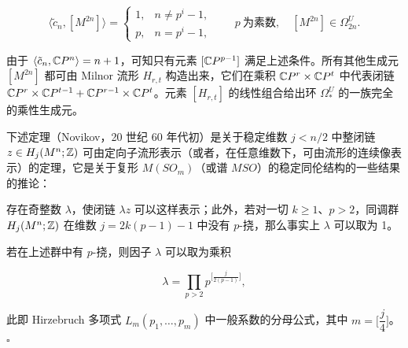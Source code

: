 \[ \langle\tilde c_n,[M^{2n}]\rangle=\begin{cases}1, & n\ne p^i-1,\\ p, & n=p^i-1,\end{cases}\qquad p\ \text{为素数},\quad [M^{2n}]\in\Omega^U_{2n}. \]

由于 $\langle\tilde c_n,\mathbb{C}P^n\rangle=n+1$，可知只有元素 $[\mathbb{C}P^{p-1}]$ 满足上述条件。所有其他生成元 $[M^{2n}]$ 都可由 Milnor 流形 $H_{r,t}$ 构造出来，它们在乘积 $\mathbb{C}P^r\times\mathbb{C}P^t$ 中代表闭链 $\mathbb{C}P^r\times\mathbb{C}P^{t-1}+\mathbb{C}P^{r-1}\times\mathbb{C}P^t$。元素 $[H_{r,t}]$ 的线性组合给出环 $\Omega_*^{U}$ 的一族完全的乘性生成元。

下述定理（Novikov，20 世纪 60 年代初）是关于稳定维数 $j<n/2$ 中整闭链 $z\in H_j(M^n;\mathbb{Z})$ 可由定向子流形表示（或者，在任意维数下，可由流形的连续像表示）的定理，它是关于复形 $M(SO_m)$（或谱 $MSO$）的稳定同伦结构的一些结果的推论：

\begin{theorem*}{}
存在奇整数 $\lambda$，使闭链 $\lambda z$ 可以这样表示；此外，若对一切 $k\ge 1$、$p>2$，同调群 $H_j(M^n;\mathbb{Z})$ 在维数 $j=2k(p-1)-1$ 中没有 $p$-挠，那么事实上 $\lambda$ 可以取为 1。
\end{theorem*}

\begin{remark}{}
若在上述群中有 $p$-挠，则因子 $\lambda$ 可以取为乘积

\[ \lambda=\prod_{p>2}p^{\bigl[\frac{j}{2(p-1)}\bigr]}, \]

此即 Hirzebruch 多项式 $L_m(p_1,\dots,p_m)$ 中一般系数的分母公式，其中 $m=\bigl[\dfrac{j}{4}\bigr]$。\hfill$\square$
\end{remark}


